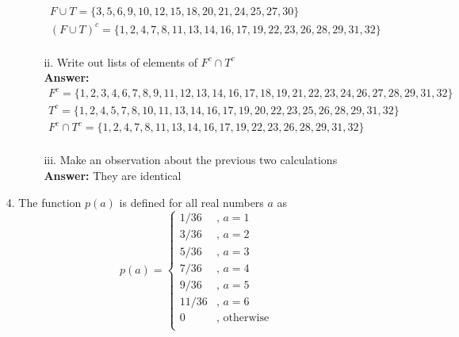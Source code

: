 \documentclass[a4paper]{article}
\begin{document}
\begin{itemize}
\begin{itemize}
\begin{itemize}
\begin{equation}
\begin{split}
	      	      	      		F \cup T = \{3, 5, 6, 9, 10, 12, 15, 18, 20, 21, 24, 25, 27, 30\} \\
	      	      	      		(F \cup T)^{c} = \{1, 2, 4, 7, 8, 11, 13, 14, 16, 17, 19, 22, 23, 26, 28, 29, 31, 32\} \\
	      	      	      	\end{split}
	      	      	      \end{equation}
	      	      	\item[ii.] Write out lists of elements of $F^{c} \cap T^{c}$ \\
	      	      	      \textbf{Answer:}
	      	      	      \begin{equation}
	      	      	      	\begin{split}
	      	      	      		F^{c} = \{1, 2, 3, 4, 6, 7, 8, 9, 11, 12, 13, 14, 16, 17, 18, 19, 21, 22, 23, 24, 26, 27, 28, 29, 31, 32\} \\
	      	      	      		T^{c} = \{1, 2, 4, 5, 7, 8, 10, 11, 13, 14, 16, 17, 19, 20, 22, 23, 25, 26, 28, 29, 31, 32\} \\
	      	      	      		F^{c} \cap T^{c} = \{1, 2, 4, 7, 8, 11, 13, 14, 16, 17, 19, 22, 23, 26, 28, 29, 31, 32\} \\
	      	      	      	\end{split}
	      	      	      \end{equation}
	      	      	\item[iii.] Make an observation about the previous two calculations \\
	      	      	      \textbf{Answer:} They are identical
	      	      \end{itemize}  
	      \end{itemize}
	\item[4.] The function $p(a)$ is defined for all real numbers $a$ as \\
	      \[
	      	p(a) =
	      	\begin{cases}
	      		1/36  & \text{, $a = 1$}   \\
	      		3/36  & \text{, $a = 2$}   \\
	      		5/36  & \text{, $a = 3$}   \\
	      		7/36  & \text{, $a = 4$}   \\
	      		9/36  & \text{, $a = 5$}   \\
	      		11/36 & \text{, $a = 6$}   \\
	      		0     & \text{, otherwise} \\
	      	\end{cases}
\]
\end{itemize}
\end{document}

